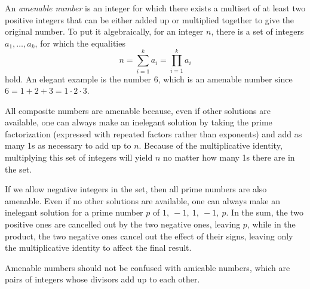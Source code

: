 \documentclass[12pt]{article}
\begin{document}
An {\em amenable number} is an integer for which there exists a multiset of at least two positive integers that can be either added up or multiplied together to give the original number. To put it algebraically, for an integer $n$, there is a set of integers ${a_1, \ldots , a_k}$, for which the equalities $$n = \sum_{i = 1}^k a_i = \prod_{i = 1}^k a_i$$ hold. An elegant example is the number 6, which is an amenable number since $6 = 1 + 2 + 3 = 1 \cdot 2 \cdot 3$.

All composite numbers are amenable because, even if other solutions are available, one can always make an inelegant solution by taking the prime factorization (expressed with repeated factors rather than exponents) and add as many 1s as necessary to add up to $n$. Because of the multiplicative identity, multiplying this set of integers will yield $n$ no matter how many 1s there are in the set.

If we allow negative integers in the set, then all prime numbers are also amenable. Even if no other solutions are available, one can always make an inelegant solution for a prime number $p$ of ${1,\ -1,\ 1,\ -1,\ p}$. In the sum, the two positive ones are cancelled out by the two negative ones, leaving $p$, while in the product, the two negative ones cancel out the effect of their signs, leaving only the multiplicative identity to affect the final result.

Amenable numbers should not be confused with amicable numbers, which are pairs of integers whose divisors add up to each other.
\end{document}
